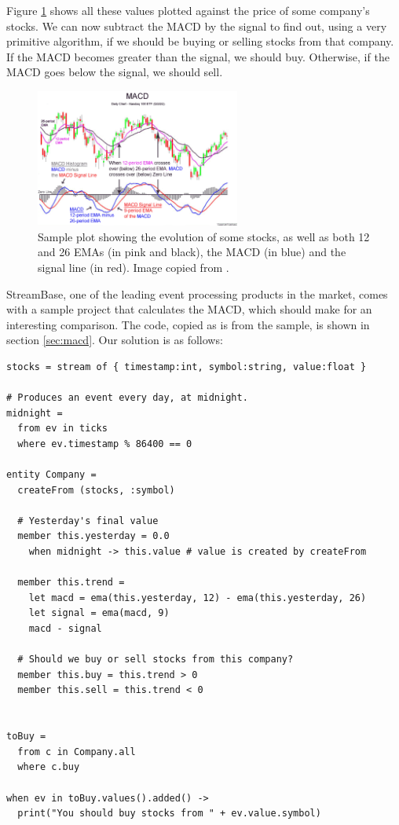 Figure \ref{fig:macd} shows all these values plotted against the price
of some company's stocks. We can now subtract the MACD by the signal
to find out, using a very primitive algorithm, if we should be buying
or selling stocks from that company. If the MACD becomes greater than
the signal, we should buy. Otherwise, if the MACD goes below the
signal, we should sell.

\begin{figure}[t]
  \centering
  \includegraphics[width=0.6\textwidth]{macd.png}
  \caption{Sample plot showing the evolution of some stocks, as well
    as both 12 and 26 EMAs (in pink and black), the MACD (in blue) and
    the signal line (in red). Image copied from \cite{macd-plot:www}.}
  \label{fig:macd}
\end{figure}

StreamBase, one of the leading event processing products in the
market, comes with a sample project that calculates the MACD, which
should make for an interesting comparison. The code, copied as is from
the sample, is shown in section \ref{sec:macd}. Our solution is as
follows:

\pagebreak
\begin{lstlisting}
stocks = stream of { timestamp:int, symbol:string, value:float }

# Produces an event every day, at midnight.
midnight =
  from ev in ticks
  where ev.timestamp % 86400 == 0

entity Company =
  createFrom (stocks, :symbol)

  # Yesterday's final value
  member this.yesterday = 0.0
    when midnight -> this.value # value is created by createFrom

  member this.trend =
    let macd = ema(this.yesterday, 12) - ema(this.yesterday, 26)
    let signal = ema(macd, 9)
    macd - signal

  # Should we buy or sell stocks from this company?
  member this.buy = this.trend > 0
  member this.sell = this.trend < 0


toBuy =
  from c in Company.all
  where c.buy

when ev in toBuy.values().added() ->
  print("You should buy stocks from " + ev.value.symbol)
\end{lstlisting}

